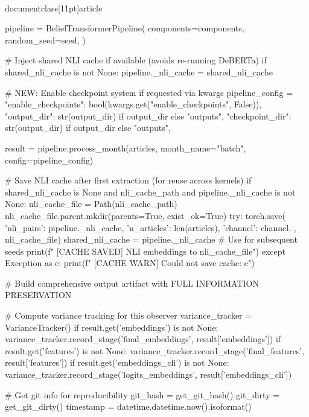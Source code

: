 \\documentclass[11pt]{article}
\begin{document}
\begin{CodeBlock}
        pipeline = BeliefTransformerPipeline(
            components=components,
            random_seed=seed,
        )
        
        # Inject shared NLI cache if available (avoids re-running DeBERTa)
        if shared_nli_cache is not None:
            pipeline._nli_cache = shared_nli_cache
        
        # NEW: Enable checkpoint system if requested via kwargs
        pipeline_config = {
            "enable_checkpoints": bool(kwargs.get("enable_checkpoints", False)),
            "output_dir": str(output_dir) if output_dir else "outputs",
            "checkpoint_dir": str(output_dir) if output_dir else "outputs",
        }
        
        result = pipeline.process_month(articles, month_name="batch", config=pipeline_config)
        
        # Save NLI cache after first extraction (for reuse across kernels)
        if shared_nli_cache is None and nli_cache_path and pipeline._nli_cache is not None:
            nli_cache_file = Path(nli_cache_path)
            nli_cache_file.parent.mkdir(parents=True, exist_ok=True)
            try:
                torch.save({
                    'nli_pairs': pipeline._nli_cache,
                    'n_articles': len(articles),
                    'channel': channel,
                }, nli_cache_file)
                shared_nli_cache = pipeline._nli_cache  # Use for subsequent seeds
                print(f"  [CACHE SAVED] NLI embeddings to {nli_cache_file}")
            except Exception as e:
                print(f"  [CACHE WARN] Could not save cache: {e}")
        
        # Build comprehensive output artifact with FULL INFORMATION PRESERVATION
        
        # Compute variance tracking for this observer
        variance_tracker = VarianceTracker()
        if result.get('embeddings') is not None:
            variance_tracker.record_stage('final_embeddings', result['embeddings'])
        if result.get('features') is not None:
            variance_tracker.record_stage('final_features', result['features'])
        if result.get('embeddings_cli') is not None:
            variance_tracker.record_stage('logits_embeddings', result['embeddings_cli'])
        
        # Get git info for reproducibility
        git_hash = get_git_hash()
        git_dirty = get_git_dirty()
        timestamp = datetime.datetime.now().isoformat()
        

\end{CodeBlock}
\end{document}

